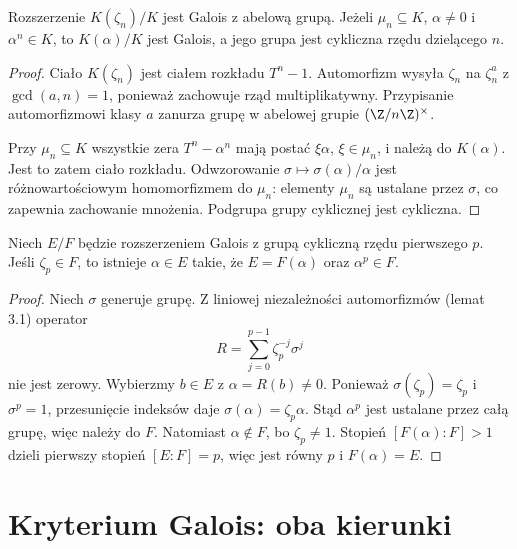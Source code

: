\begin{lemat}
Rozszerzenie $K(\zeta_n)/K$ jest Galois z abelową grupą. Jeżeli $\mu_n\subseteq K$, $\alpha\ne0$ i $\alpha^n\in K$, to $K(\alpha)/K$ jest Galois, a jego grupa jest cykliczna rzędu dzielącego $n$.
\end{lemat}
\begin{proof}
Ciało $K(\zeta_n)$ jest ciałem rozkładu $T^n-1$. Automorfizm wysyła $\zeta_n$ na $\zeta_n^a$ z $\gcd(a,n)=1$, ponieważ zachowuje rząd multiplikatywny. Przypisanie automorfizmowi klasy $a$ zanurza grupę w abelowej grupie $(\Z/n\Z)^\times$.

Przy $\mu_n\subseteq K$ wszystkie zera $T^n-\alpha^n$ mają postać $\xi\alpha$, $\xi\in\mu_n$, i należą do $K(\alpha)$. Jest to zatem ciało rozkładu. Odwzorowanie $\sigma\mapsto\sigma(\alpha)/\alpha$ jest różnowartościowym homomorfizmem do $\mu_n$: elementy $\mu_n$ są ustalane przez $\sigma$, co zapewnia zachowanie mnożenia. Podgrupa grupy cyklicznej jest cykliczna.
\end{proof}

\begin{lemat}
Niech $E/F$ będzie rozszerzeniem Galois z grupą cykliczną rzędu pierwszego $p$. Jeśli $\zeta_p\in F$, to istnieje $\alpha\in E$ takie, że $E=F(\alpha)$ oraz $\alpha^p\in F$.
\end{lemat}
\begin{proof}
Niech $\sigma$ generuje grupę. Z liniowej niezależności automorfizmów (lemat 3.1) operator
\[
R=\sum_{j=0}^{p-1}\zeta_p^{-j}\sigma^j
\]
nie jest zerowy. Wybierzmy $b\in E$ z $\alpha=R(b)\ne0$. Ponieważ $\sigma(\zeta_p)=\zeta_p$ i $\sigma^p=1$, przesunięcie indeksów daje $\sigma(\alpha)=\zeta_p\alpha$. Stąd $\alpha^p$ jest ustalane przez całą grupę, więc należy do $F$. Natomiast $\alpha\notin F$, bo $\zeta_p\ne1$. Stopień $[F(\alpha):F]>1$ dzieli pierwszy stopień $[E:F]=p$, więc jest równy $p$ i $F(\alpha)=E$.
\end{proof}

\section{Kryterium Galois: oba kierunki}

